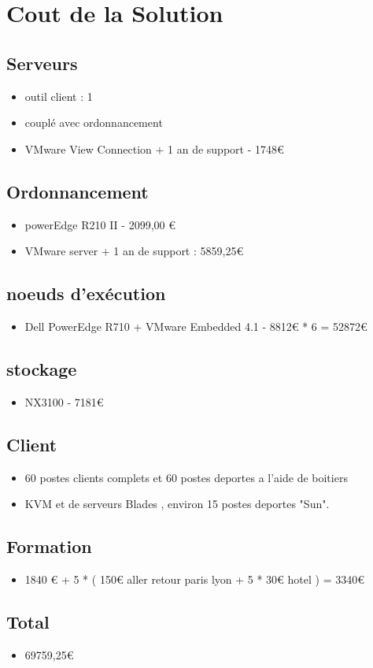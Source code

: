 \section{Cout de la Solution}

\subsection{Serveurs}

\begin{itemize}
	\item outil client : 1
	\item couplé avec ordonnancement
	\item VMware View Connection + 1 an de support - 1748€
\end{itemize}

\subsection{Ordonnancement}
\begin{itemize}
	\item powerEdge R210 II - 2099,00 €
	\item VMware server + 1 an de support : 5859,25€
\end{itemize}

\subsection{noeuds d’exécution}
\begin{itemize}
 	\item Dell PowerEdge R710 + VMware Embedded 4.1 - 8812€ * 6 = 52872€
\end{itemize}

\subsection{stockage}
\begin{itemize}
 	\item NX3100 - 7181€
\end{itemize}

\subsection{Client}
\begin{itemize}
	\item 60 postes clients complets et 60 postes deportes a l'aide de boitiers
	\item KVM et de serveurs Blades , environ 15 postes deportes "Sun".
\end{itemize}

\subsection{Formation}
\begin{itemize}
	\item 1840 € + 5 * ( 150€ aller retour paris lyon + 5 * 30€ hotel ) = 3340€
\end{itemize}


\subsection{Total}
\begin{itemize}
	\item 69759,25€
\end{itemize}